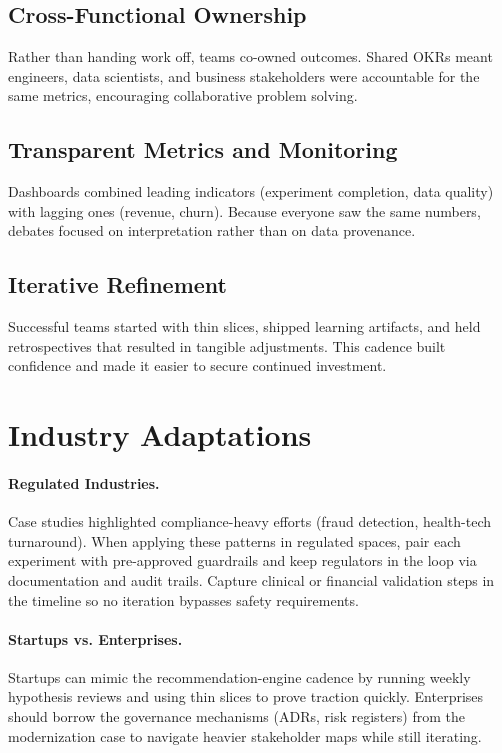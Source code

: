 \subsection{Cross-Functional Ownership}
Rather than handing work off, teams co-owned outcomes. Shared OKRs meant engineers, data scientists, and business stakeholders were accountable for the same metrics, encouraging collaborative problem solving.

\subsection{Transparent Metrics and Monitoring}
Dashboards combined leading indicators (experiment completion, data quality) with lagging ones (revenue, churn). Because everyone saw the same numbers, debates focused on interpretation rather than on data provenance.

\subsection{Iterative Refinement}
Successful teams started with thin slices, shipped learning artifacts, and held retrospectives that resulted in tangible adjustments. This cadence built confidence and made it easier to secure continued investment.

\section{Industry Adaptations}
\label{sec:case-industry}
\paragraph{Regulated Industries.} Case studies highlighted compliance-heavy efforts (fraud detection, health-tech turnaround). When applying these patterns in regulated spaces, pair each experiment with pre-approved guardrails and keep regulators in the loop via documentation and audit trails. Capture clinical or financial validation steps in the timeline so no iteration bypasses safety requirements.

\paragraph{Startups vs. Enterprises.} Startups can mimic the recommendation-engine cadence by running weekly hypothesis reviews and using thin slices to prove traction quickly. Enterprises should borrow the governance mechanisms (ADRs, risk registers) from the modernization case to navigate heavier stakeholder maps while still iterating.

